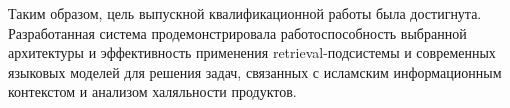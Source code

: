 Таким образом, цель выпускной квалификационной работы была достигнута. Разработанная система продемонстрировала работоспособность выбранной архитектуры и эффективность применения retrieval-подсистемы и современных языковых моделей для решения задач, связанных с исламским информационным контекстом и анализом халяльности продуктов.
